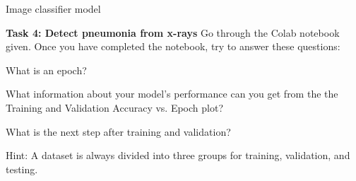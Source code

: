 \documentclass[UKenglish]{beamer}
\begin{document}
\begin{frame}{Image classifier model}
  \begin{alertblock}{\textbf{Task 4: Detect pneumonia from x-rays}}
      Go through the Colab notebook given. Once you have completed the
      notebook, try to answer these questions: \par \vspace{5pt}
      What is an \alert{epoch}? \par \vspace{3pt}
      What \alert{information about your model's performance} can you get from the the Training and Validation Accuracy vs. Epoch plot? \par \vspace{3pt}
      What is \alert{the next step} after training and validation? \par
      \alert{Hint: } A dataset is always divided into three groups for training, validation, and testing. \par \vspace{3pt}
  \end{alertblock}

\end{frame}
\end{document}

